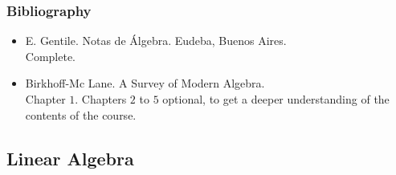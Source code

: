 \documentclass[spanish]{article}
\begin{document}
\subsubsection{Bibliography}
\begin{itemize}
  \item
E. Gentile. Notas de \'Algebra. Eudeba, Buenos Aires.\\
Complete.

  \item
Birkhoff-Mc Lane. A Survey of Modern Algebra.\\
Chapter $1$. Chapters $2$ to $5$ optional, to get a deeper understanding of
the contents of the course.
\end{itemize}

\hrulefill

\subsection{Linear Algebra}
\end{document}
